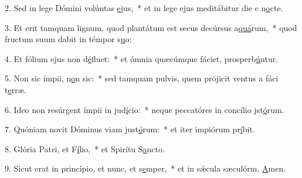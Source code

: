 2. Sed in lege Dómini volúntas \uline{e}jus,~* et in lege ejus meditábitur die c n\uline{o}cte.\par 
3. Et erit tamquam lignum, quod plantátum est secus decúrsus a\uline{quá}rum,~* quod fructum suum dabit in témpor s\uline{u}o:\par 
4. Et fólium ejus non d\uline{é}fluet:~* et ómnia quæcúmque fáciet, prosperb\uline{ú}ntur.\par 
5. Non sic ímpii, n\uline{o}n sic:~* sed tamquam pulvis, quem prójicit ventus a fáci t\uline{e}rræ.\par 
6. Ideo non resúrgent ímpii in jud\uline{í}cio:~* neque peccatóres in concílio jst\uline{ó}rum.\par 
7. Quóniam novit Dóminus viam just\uline{ó}rum:~* et iter impiórum pr\uline{í}bit.\par 
8. Glória Patri, et F\uline{í}lio,~* et Spirítu S\uline{a}ncto.\par 
9. Sicut erat in princípio, et nunc, et s\uline{e}mper,~* et in sǽcula sæculórm. \uline{A}men.\par 
